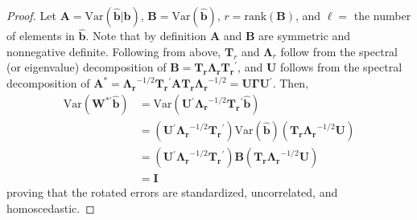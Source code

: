 \documentclass[12pt]{article} %
\newcommand{\trans}{\ensuremath{^\prime}}
\newcommand{\var}{\ensuremath{\mathrm{Var}}}
\begin{document}
\begin{proof}
 Let $\bm{A} = \var(\widehat{\bm{b}} | \bm{b})$, $\bm{B} = \var(\widehat{\bm{b}})$, $r = \text{rank}(\bm{B})$, and $\ell = $ the number of elements in $\widehat{\bm{b}}$. Note that by definition $\bm{A}$ and $\bm{B}$ are symmetric and nonnegative definite. Following from above, $\bm{T}_r$ and $\bm{\Lambda}_r$ follow from the spectral (or eigenvalue) decomposition of $\bm{B} = \bm{T_r \Lambda_r T_r}\trans$, and $\bm{U}$ follows from the spectral decomposition of $\bm{A^*} = \bm{\Lambda_r}^{-1/2} \bm{T_r}\trans \bm{A T_r \Lambda_r}^{-1/2} = \bm{U} \bm{\Gamma} \bm{U}\trans$. Then, 
\begin{align*}
\var(\bm{W}^{*\prime} \widehat{\bm{b}}) &= \var(\bm{U}\trans \bm{\Lambda_r}^{-1/2} \bm{T_r}\trans \widehat{\bm{b}})\\
&= (\bm{U}\trans \bm{\Lambda_r}^{-1/2} \bm{T_r}\trans) \var(\widehat{\bm{b}}) (\bm{T_r \Lambda_r}^{-1/2} \bm{U})\\
&= (\bm{U}\trans \bm{\Lambda_r}^{-1/2} \bm{T_r}\trans) \bm{B} (\bm{T_r \Lambda_r}^{-1/2} \bm{U})\\
&= \bm{I}
\end{align*}
proving that the rotated errors are standardized, uncorrelated, and homoscedastic.
\end{proof}
 
\end{document}
